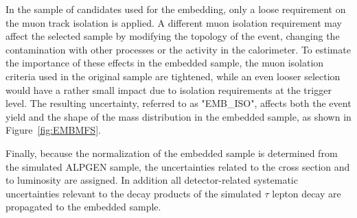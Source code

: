 In the sample of  \Zmumu candidates used for the embedding,  only a loose requirement on the  muon track isolation is applied.
A different  muon isolation requirement may affect the selected sample by modifying the topology of the event, 
changing the contamination with other processes or the activity in the calorimeter. 
To estimate  the importance of these effects in the
embedded sample, the muon isolation criteria used in  the original \Zmumu sample are tightened,
while an even 
looser selection would have a rather small impact due to  isolation requirements at the trigger level.
The resulting uncertainty, referred to as "EMB\_ISO", affects both the event yield and the shape of 
the \mmc mass distribution in the embedded sample, as shown in Figure~\ref{fig:EMBMFS}. 

Finally, because the normalization of the embedded sample is determined from the simulated ALPGEN sample, 
the uncertainties related to the cross section and to luminosity are assigned. In addition
all detector-related systematic uncertainties relevant to the decay products of the simulated $\tau$ lepton 
decay are propagated to the embedded sample.
 

